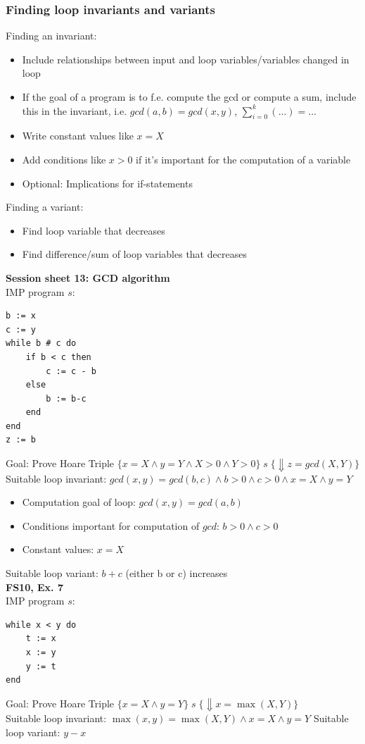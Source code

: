 \documentclass{article}
\begin{document}
\subsubsection{Finding loop invariants and variants}
Finding an invariant: \begin{itemize}
    \item Include relationships between input and loop variables/variables changed in loop
    \item If the goal of a program is to f.e. compute the gcd or compute a sum, include
    this in the invariant, i.e. $gcd(a,b)=gcd(x,y)$, $\sum_{i=0}^{k}(...)=...$
    \item Write constant values like $x=X$
    \item Add conditions like $x>0$ if it's important for the computation of a variable
    \item Optional: Implications for if-statements
\end{itemize}
Finding a variant:
\begin{itemize}
    \item Find loop variable that decreases
    \item Find difference/sum of loop variables that decreases
\end{itemize}
\smallskip
\textbf{Session sheet 13: GCD algorithm} \\
IMP program $s$:
\begin{verbatim}
b := x
c := y
while b # c do
    if b < c then
        c := c - b
    else
        b := b-c
    end
end
z := b
\end{verbatim}
Goal: Prove Hoare Triple 
$\{x=X \land y=Y\land X > 0 \land Y >0\} \; s \; \{\Downarrow z=gcd(X,Y)\}$ \\
Suitable loop invariant: $gcd(x,y)=gcd(b,c) \land b >0 \land c > 0 \land x=X \land y=Y$ 
\begin{itemize}
    \item Computation goal of loop: $gcd(x,y) = gcd(a,b)$
    \item Conditions important for computation of $gcd$: $b>0 \land c > 0$
    \item Constant values: $x=X$
\end{itemize}
Suitable loop variant: $b+c$ (either b or c) increases
 \smallskip \\
\textbf{FS10, Ex. 7} \\
IMP program $s$:
\begin{verbatim}
while x < y do
    t := x
    x := y
    y := t
end
\end{verbatim}
Goal: Prove Hoare Triple $\{x=X \land y=Y\} \; s \; \{\Downarrow x = \max(X,Y)\}$ \\
Suitable loop invariant: $\max(x,y)=\max(X,Y) \land x=X \land y=Y$
Suitable loop variant: $y-x$ 
\end{document}
